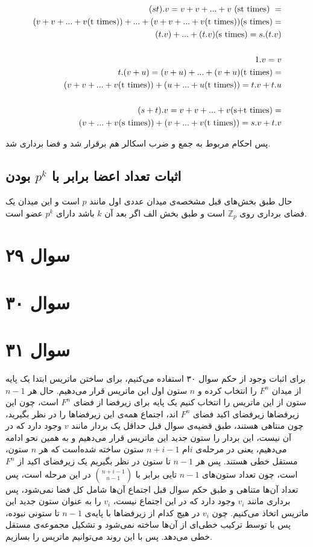 \documentclass[12pt,a4paper]{article}
\begin{document}
\begin{latin}
\begin{align*}
(st).v = v+v+...+v \text{\space(st times)\space} =\\ (v+v+...+v \text{(t times)})+ ... + (v+v+...+v \text{(t times)}) \text{(s times)} = \\
(t.v) + ... + (t.v) \text{(s times)} = s.(t.v)
\\
\\
1.v = v
\\
t.(v+u) = (v+u)+...+(v+u) \text{(t times)} =\\ (v+v+...+v \text{(t times)}) + (u + ... + u \text{(t times)}) = t.v + t.u
\\
\\
(s+t).v = v+v+...+v \text{(s+t times)} = \\
(v+...+v \text{(s times)}) + (v+...+v \text{(t times)}) = s.v + t.v
\end{align*}
\end{latin}
پس احکام مربوط به جمع و ضرب اسکالر هم برقرار شد و فضا برداری شد.

\subsection{اثبات تعداد اعضا برابر با $p^k$ بودن}
حال طبق بخش‌های قبل مشخصه‌ی میدان عددی اول مانند $p$ است و این میدان یک فضای برداری روی 
$\mathbb{Z}_p$
است و طبق بخش الف اگر بعد آن $k$ باشد دارای $p^k$ عضو است.


\section{سوال ۲۹}

\section{سوال ۳۰}

\section{سوال ۳۱}
برای اثبات وجود از حکم سوال ۳۰ استفاده می‌کنیم، برای ساختن ماتریس ابتدا یک پایه از میدان $F^n$ را انتخاب کرده و $n$ ستون اول این ماتریس قرار می‌دهیم. 
حال هر
$n-1$
ستون از این ماتریس را انتخاب کنیم یک پایه‌ برای زیرفضا از فضای 
$F^n$
است، چون این زیرفضاها زیرفضای اکید فضای 
$F^n$
اند، اجتماع همه‌ی این زیرفضا‌ها را در نظر بگیرید، چون منتاهی هستند، طبق قضیه‌ی سوال قبل حداقل یک بردار مانند 
$v$
وجود دارد که در آن نیست، این بردار را ستون جدید این ماتریس قرار می‌دهیم و به همین نحو ادامه می‌دهیم، یعنی در مرحله‌ی $i$ام 
$n+i-1$
ستون ساخته شده‌است که هر $n$ ستون، مستقل خطی هستند. پس هر $n-1$ تا ستون در نظر بگیریم یک زیرفضای اکید از 
$F^n$
است، چون تعداد ستون‌های $n-1$ تایی برابر با 
$\binom{n+i-1}{n-1}$
در این مرحله است، پس تعداد آن‌ها متناهی و طبق حکم سوال قبل اجتماع آن‌ها شامل کل فضا نمی‌شود، پس برداری مانند $v_i$ وجود دارد که در این اجتماع نیست، $v_i$ را به عنوان ستون جدید این ماتریس اتخاذ می‌کنیم. چون $v_i$ در هیچ کدام از زیرفضا‌ها با پایه‌ی $n-1$ تا ستونی نبوده، پس با توسط ترکیب خطی‌ای از آن‌ها ساخته نمی‌شود و تشکیل مجموعه‌ی مستقل خطی می‌دهد. پس با این روند می‌توانیم ماتریس را بسازیم.
\end{document}
